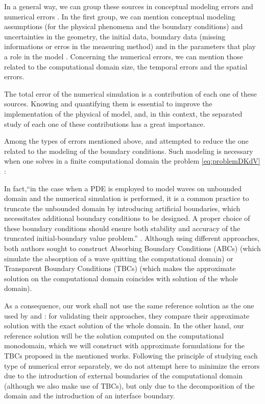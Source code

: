 \indent In a general way, we can group these sources in conceptual modeling errors and numerical errors \cite{roache1997}. In the first group, we can mention conceptual modeling assumptions (for the physical phenomena and the boundary conditions) and uncertainties in the geometry, the initial data, boundary data (missing informations or erros in the measuring method) and in the parameters that play a role in the model \cite{roache1997,balagurusamy2008}. Concerning the numerical errors, we can mention those related to the computational domain size, the temporal errors and the spatial errors.  \cite{karniadakis1995,roache1997} 

\indent The total error of the numerical simulation is a contribution of each one of these sources. Knowing and quantifying them is essential to improve the implementation of the physical of model, and, in this context, the separated study of each one of these contributions has a great importance.

\indent Among the types of errors mentioned above, \cite{zheng2008} and \cite{besse2015} attempted to reduce the one related to the modeling of the boundary conditions. Such modeling is necessary when one solves in a finite computational domain the problem \eqref{eq:problemDKdV} :

\indent In fact,``in the case when a PDE is employed to model waves on unbounded domain and the numerical simulation is performed, it is a common practice to truncate the unbounded domain by introducing artificial boundaries, which necessitates additional boundary conditions to be designed. A proper choice of these boundary conditions should ensure both stability and accuracy of the truncated initial-boundary value problem.'' \cite{zheng2008}. Although using different approaches, both authors sought to construct Absorbing Boundary Conditions (ABCs) (which simulate the absorption of a wave quitting the computational domain) or Transparent Boundary Conditions (TBCs) (which makes the approximate solution on the computational domain coincides with solution of the whole domain).

\indent As a consequence, our work shall not use the same reference solution as the one used by \cite{zheng2008} and \cite{besse2015} : for validating their approaches,  they compare their approximate solution with the exact solution of the whole domain. In the other hand, our reference solution will be the solution computed on the computational monodomain, which we will construct with approximate formulations for the TBCs proposed in the mentioned works. Following the principle of studying each type of numerical error separately, we do not attempt here to minimize the errors due to the introduction of external boundaries of the computational domain (although we also make use of TBCs), but only due to the decomposition of the domain and the introduction of an interface boundary.

